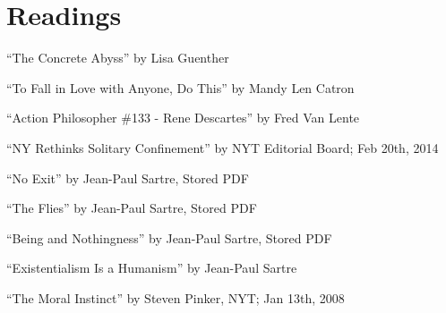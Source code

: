 \documentclass[11 pt, twoside]{article}
\begin{document}
\section{Readings}
\begin{enumerate}
\hypertarget{1}{\item ``The Concrete Abyss'' by Lisa Guenther}
\hypertarget{2}{\item ``To Fall in Love with Anyone, Do This'' by Mandy Len Catron}
\hypertarget{3}{\item ``Action Philosopher \#133 - Rene Descartes'' by Fred Van Lente}
\hypertarget{4}{\item ``NY Rethinks Solitary Confinement'' by NYT Editorial Board; Feb 20th, 2014}
\hypertarget{5}{\item ``No Exit'' by Jean-Paul Sartre, Stored PDF}
\hypertarget{6}{\item ``The Flies'' by Jean-Paul Sartre, Stored PDF}
\hypertarget{7}{\item ``Being and Nothingness'' by Jean-Paul Sartre, Stored PDF}
\hypertarget{8}{\item ``Existentialism Is a Humanism'' by Jean-Paul Sartre}
\hypertarget{9}{\item ``The Moral Instinct'' by Steven Pinker, NYT; Jan 13th, 2008}
\end{enumerate}
\end{document}
